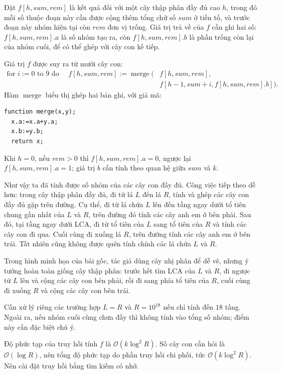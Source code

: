 \documentclass[11pt]{article}
\newcommand{\Oh}{\mathcal{O}}
\begin{document}
Đặt $f[h,\mathit{sum},\mathit{rem}]$ là kết quả đối với một cây thập phân đầy
đủ cao $h$, trong đó mỗi số thuộc đoạn này cần được cộng thêm tổng chữ số
$\mathit{sum}$ ở tiền tố, và trước đoạn này nhóm hiện tại còn
$\mathit{rem}$ đơn vị trống. Giá trị trả về của $f$ cần ghi hai số:
$f[h,\mathit{sum},\mathit{rem}].a$ là số nhóm tạo ra, còn
$f[h,\mathit{sum},\mathit{rem}].b$ là phần trống còn lại của nhóm cuối, để có
thể ghép với cây con kế tiếp.

Giá trị $f$ được suy ra từ mười cây con:
\[
\begin{aligned}
\text{for }i:=0\text{ to }9\text{ do }\quad
f[h,\mathit{sum},\mathit{rem}]
 :=\operatorname{merge}\bigl(&f[h,\mathit{sum},\mathit{rem}],\\
&f[h-1,\mathit{sum}+i,
  f[h,\mathit{sum},\mathit{rem}].b]\bigr).
\end{aligned}
\]
Hàm $\operatorname{merge}$ biểu thị ghép hai bản ghi, với giả mã:
\begin{verbatim}
function merge(x,y);
  x.a:=x.a+y.a;
  x.b:=y.b;
  return x;
\end{verbatim}

Khi $h=0$, nếu $\mathit{rem}>0$ thì $f[h,\mathit{sum},\mathit{rem}].a=0$,
ngược lại $f[h,\mathit{sum},\mathit{rem}].a=1$; giá trị $b$ cần tính theo quan
hệ giữa $\mathit{sum}$ và $k$.

Như vậy ta đã tính được số nhóm của các cây con đầy đủ. Công việc tiếp theo
dễ hơn: trong cây thập phân đầy đủ, đi từ lá $L$ đến lá $R$, tính và ghép các
cây con đầy đủ gặp trên đường. Cụ thể, đi từ lá chứa $L$ lên đến tầng ngay
dưới tổ tiên chung gần nhất của $L$ và $R$, trên đường đó tính các cây anh em
ở bên phải. Sau đó, tại tầng ngay dưới LCA, đi từ tổ tiên của $L$ sang tổ tiên
của $R$ và tính các cây con đi qua. Cuối cùng đi xuống lá $R$, trên đường tính
các cây anh em ở bên trái. Tất nhiên cũng không được quên tính chính các lá
chứa $L$ và $R$.

Trong hình minh họa của bài gốc, tác giả dùng cây nhị phân để dễ vẽ, nhưng ý
tưởng hoàn toàn giống cây thập phân: trước hết tìm LCA của $L$ và $R$, đi
ngược từ $L$ lên và cộng các cây con bên phải, rồi đi sang phía tổ tiên của
$R$, cuối cùng đi xuống $R$ và cộng các cây con bên trái.

Cần xử lý riêng các trường hợp $L=R$ và $R=10^{18}$ nếu chỉ tính đến $18$
tầng. Ngoài ra, nếu nhóm cuối cùng chưa đầy thì không tính vào tổng số nhóm;
điểm này cần đặc biệt chú ý.

Độ phức tạp của truy hồi tính $f$ là $\Oh(k\log^2 R)$. Số cây con cần hỏi là
$\Oh(\log R)$, nên tổng độ phức tạp do phần truy hồi chi phối, tức
$\Oh(k\log^2 R)$. Nên cài đặt truy hồi bằng tìm kiếm có nhớ.
\end{document}
